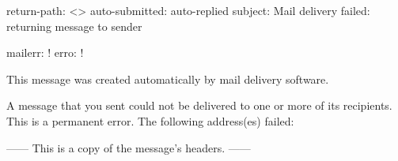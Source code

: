 return-path: <>
auto-submitted: auto-replied
subject: Mail delivery failed: returning message to sender

mailerr: !
erro: !

This message was created automatically by mail delivery software.

A message that you sent could not be delivered to one or more of its
recipients. This is a permanent error. The following address(es) failed:


------ This is a copy of the message's headers. ------
